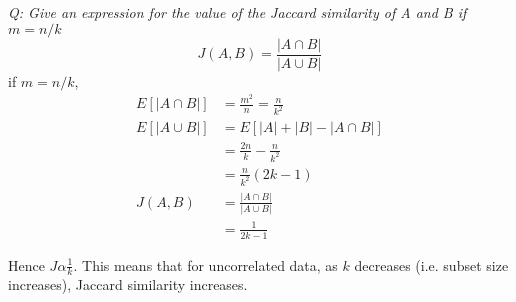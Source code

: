 \documentclass{homeworg}
\begin{document}
\emph{Q: Give an expression for the value of the Jaccard similarity of A and B if $m = n/k$}
$$
J(A,B) = \frac{|A \cap B|}{|A \cup B|}
$$
if $m = n/k$, 
\begin{align*}
    E[|A \cap B|] &=  \frac{m^2}{n} = \frac{n}{k^2}\\
    E[|A \cup B|] &=  E[|A| + |B| - |A \cap B|]\\
    & = \frac{2n}{k} - \frac{n}{k^2}\\
    & = \frac{n}{k^2} (2k- 1)\\
    J(A,B) &= \frac{|A \cap B|}{|A \cup B|}\\
    &=\frac{1}{2k-1}
\end{align*}

Hence $J \alpha \frac{1}{k}$. This means that for uncorrelated data, as $k$ decreases (i.e. subset size increases), Jaccard similarity increases.
\end{document}

